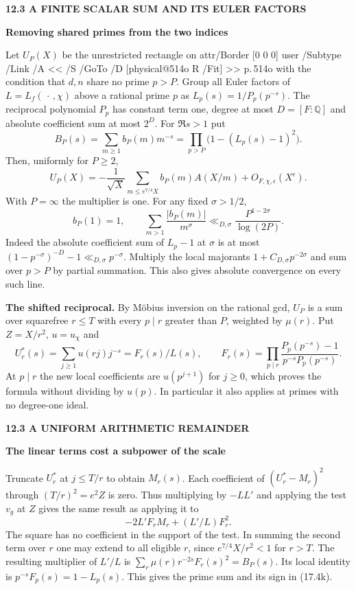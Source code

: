 \documentclass[11pt,letterpaper]{article}
\makeatletter
\newcommand{\rightmarktext}{}
\newcommand{\printfolio}{}
\newcommand{\leaf}[4]{\clearpage\gdef\printfolio{#1}\gdef\rightmarktext{#2}%
  {\small\sffamily\bfseries\color{ink}#3\par}\vspace{3pt}%
  {\LARGE\bfseries #4\par}\vspace{5pt}}
\newcommand{\point}[1]{\par\smallskip\textbf{#1.}\enspace\ignorespaces}
\newcommand{\Q}{\mathbb Q}
\newcommand{\MusicPDFPageRef}[1]{\pdfpageref\csname physical@#1\endcsname\space\space 0 R}
\newcommand{\pagelink}[2]{\leavevmode\pdfstartlink attr{/Border [0 0 0]} user{%
  /Subtype /Link /A << /S /GoTo /D [\MusicPDFPageRef{#1} /Fit] >>}%
  {\color{ink}#2}\pdfendlink}
\newcommand{\pg}[1]{\pagelink{#1}{p.\,#1}}
\makeatother
\begin{document}
\leaf{514p}{The common-divisor identity}{12.3 \quad A FINITE SCALAR SUM AND ITS EULER FACTORS}{Removing shared primes from the two indices}
Let $U_P(X)$ be the unrestricted rectangle on \pg{514o} with the
condition that $d,n$ share no prime $p>P$. Group all Euler factors of
$L=L_f(\,\cdot\,,\chi)$ above a rational prime $p$ as
$L_p(s)=1/P_p(p^{-s})$. The reciprocal polynomial $P_p$ has constant
term one, degree at most $D=[F:\Q]$ and absolute coefficient sum
at most $2^D$. For $\Re s>1$ put
\[
 B_P(s)=\sum_{m\ge1}b_P(m)m^{-s}
       =\prod_{p>P}\bigl(1-(L_p(s)-1)^2\bigr).
\]
Then, uniformly for $P\ge2$,
\[
 U_P(X)=-\frac1{\sqrt X}\sum_{m\le e^{7/4}X}b_P(m)A(X/m)
                         +O_{F,\chi,\epsilon}(X^\epsilon).
 \tag{17.4k}
\]
With $P=\infty$ the multiplier is one. For any fixed $\sigma>1/2$,
\[
        b_P(1)=1,\qquad
        \sum_{m>1}\frac{|b_P(m)|}{m^\sigma}
           \ll_{D,\sigma}\frac{P^{1-2\sigma}}{\log(2P)}.
 \tag{17.4l}
\]
Indeed the absolute coefficient sum of $L_p-1$ at $\sigma$ is at
most $(1-p^{-\sigma})^{-D}-1\ll_{D,\sigma}p^{-\sigma}$. Multiply
the local majorants $1+C_{D,\sigma}p^{-2\sigma}$ and sum over
$p>P$ by partial summation. This also gives absolute convergence on
every such line.

\point{The shifted reciprocal}
By M\"obius inversion on the rational gcd, $U_P$ is a sum over
squarefree $r\le T$ with every $p\mid r$ greater than $P$, weighted
by $\mu(r)$. Put $Z=X/r^2$, $u=u_\chi$ and
\[
 U_r^*(s)=\sum_{j\ge1}u(rj)j^{-s}=F_r(s)/L(s),\qquad
 F_r(s)=\prod_{p\mid r}
       \frac{P_p(p^{-s})-1}{p^{-s}P_p(p^{-s})}.
\]
At $p\mid r$ the new local coefficients are $u(p^{j+1})$ for
$j\ge0$, which proves the formula without dividing by $u(p)$.
In particular it also applies at primes with no degree-one ideal.

\leaf{514q}{The truncation after gcd inversion}{12.3 \quad A UNIFORM ARITHMETIC REMAINDER}{The linear terms cost a subpower of the scale}
Truncate $U_r^*$ at $j\le T/r$ to obtain $M_r(s)$. Each coefficient
of $(U_r^*-M_r)^2$ through $(T/r)^2=e^2 Z$ is zero. Thus multiplying
by $-LL'$ and applying the test $v_g$ at $Z$ gives the same result as
applying it to
\[
                       -2L' F_r M_r+(L'/L)F_r^2 .
\]
The square has no coefficient in the support of the test. In summing
the second term over $r$ one may extend to all eligible $r$, since
$e^{7/4}X/r^2<1$ for $r>T$. The resulting multiplier of $L'/L$ is
$\sum_r\mu(r)r^{-2s}F_r(s)^2=B_P(s)$. Its local identity is
$p^{-s}F_p(s)=1-L_p(s)$. This gives the prime sum and its sign in
(17.4k).
\end{document}
